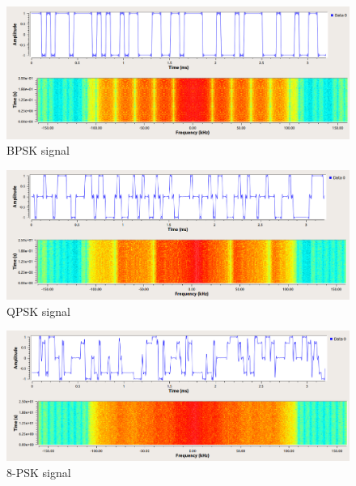 \begin{figure}[!htb]
	\includegraphics[width=\linewidth]{pics/BPSK_SIG}
	\caption{BPSK signal}\label{fig:BPSK}
	\endminipage\hfill
\end{figure}
\begin{figure}[!htb]
	\includegraphics[width=\linewidth]{pics/QPSK_SIG}
	\caption{QPSK signal}\label{fig:QPSK}
	\endminipage\hfill
\end{figure}
\begin{figure}[!htb]
	\includegraphics[width=\linewidth]{pics/8-PSK_SIG}
	\caption{8-PSK signal}\label{fig:8-PSK}
	\endminipage
\end{figure}

